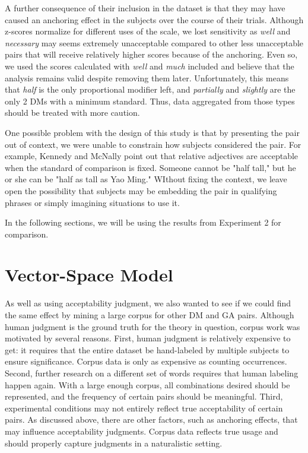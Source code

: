\documentclass[11pt]{article}
\begin{document}
A further consequence of their inclusion in the dataset is that they may have caused an anchoring effect in the subjects over the course of their trials. Although z-scores normalize for different uses of the scale, we lost sensitivity as \textit{well} and \textit{necessary} may seems extremely unacceptable compared to other less unacceptable pairs that will receive relatively higher scores because of the anchoring. Even so, we used the scores calculated with \textit{well} and \textit{much} included and believe that the analysis remains valid despite removing them later. Unfortunately, this means that \textit{half} is the only proportional modifier left, and \textit{partially} and \textit{slightly} are the only 2 DMs with a minimum standard. Thus, data aggregated from those types should be treated with more caution. 

One possible problem with the design of this study is that by presenting the pair out of context, we were unable to constrain how subjects considered the pair. For example, Kennedy and McNally  point out that relative adjectives are acceptable when the standard of comparison is fixed. Someone cannot be "half tall," but he or she can be "half as tall as Yao Ming." WIthout fixing the context, we leave open the possibility that subjects may be embedding the pair in qualifying phrases or simply imagining situations to use it.

In the following sections, we will be using the results from Experiment 2 for comparison.

\section{Vector-Space Model}

As well as using acceptability judgment, we also wanted to see if we could find the same effect by mining a large corpus for other DM and GA pairs. Although human judgment is the ground truth for the theory in question, corpus work was motivated by several reasons. First, human judgment is relatively expensive to get: it requires that the entire dataset be hand-labeled by multiple subjects to ensure significance. Corpus data is only as expensive as counting occurrences. Second, further research on a different set of words requires that human labeling happen again. With a large enough corpus, all combinations desired should be represented, and the frequency of certain pairs should be meaningful. Third, experimental conditions may not entirely reflect true acceptability of certain pairs. As discussed above, there are other factors, such as anchoring effects, that may influence acceptability judgments. Corpus data reflects true usage and should properly capture judgments in a naturalistic setting.
\end{document}
